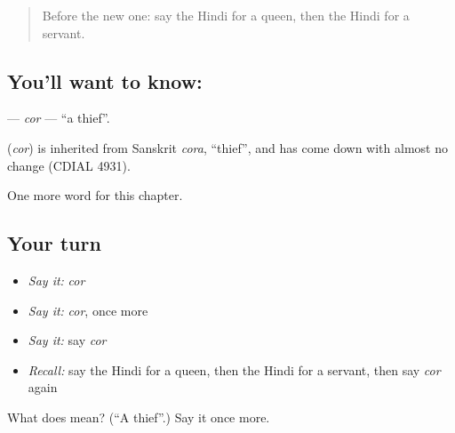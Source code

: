 \label{lesson:HI-C196-cor}



\begin{quote}
Before the new one: say the Hindi for a queen, then the Hindi for a servant.
\end{quote}

\subsection*{You'll want to know: }
\textbf{} — \emph{cor} — \textquotedblleft{}a thief\textquotedblright{}.

\begin{cousinweb}
\textbf{} (\emph{cor}) is inherited from Sanskrit \emph{cora}, \textquotedblleft{}thief\textquotedblright{}, and has come down with almost no change (CDIAL 4931).
\end{cousinweb}

\begin{grammarlens}[title={What you've built}]
One more word for this chapter.
\end{grammarlens}

\subsection*{Your turn}
\begin{itemize}
\raggedright
  \item \emph{Say it:} \emph{cor}
  \item \emph{Say it:} \emph{cor}, once more
  \item \emph{Say it:} say \emph{cor}
  \item \emph{Recall:} say the Hindi for a queen, then the Hindi for a servant, then say \emph{cor} again
\end{itemize}

\begin{tcolorbox}[breakable,colback=teal!4,colframe=teal!35!black,title={Before you move on}]
What does  mean? (\textquotedblleft{}A thief\textquotedblright{}.) Say it once more.
\end{tcolorbox}
